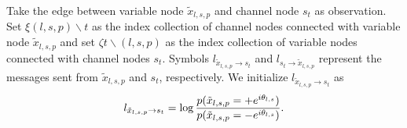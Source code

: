 \documentclass[conference]{IEEEtran}
\begin{document}
Take the edge between variable node ${\tilde {x}_{l,s,p}}$ and channel node ${s_t}$ as observation. Set $\xi (l,s,p)\backslash t$ as the index collection of channel nodes connected with variable node ${\tilde {x}_{l,s,p}}$ and set $\zeta t\backslash (l,s,p)$ as the index collection of variable nodes connected with channel nodes ${s_t}$. Symbols ${l_{{{\tilde {x}}_{l,s,p}} \to {s_t}}}$ and ${l_{{s_t} \to {{\tilde {x}}_{l,s,p}}}}$ represent the messages sent from ${\tilde {x}_{l,s,p}}$ and ${s_t}$, respectively. We initialize ${l_{{{\tilde {x}}_{l,s,p}} \to {s_t}}}$ as
\begin{equation}
{l_{{{\tilde x}_{l,s,p}} \to {s_t}}} = \log {\rm{ }}\frac{{p({{\tilde x}_{l,s,p}} =  + {e^{i{\theta _{l,s}}}})}}{{p({{\tilde x}_{l,s,p}} =  - {e^{i{\theta _{l,s}}}})}}\label{8}.
\end{equation}
\end{document}
